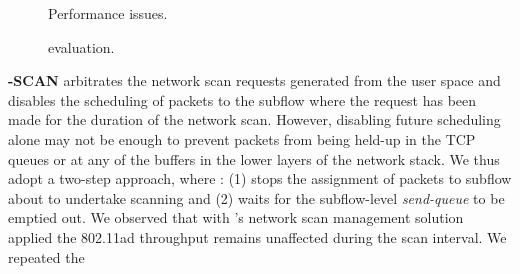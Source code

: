\begin{figure*}[t]
    \centering
    \hfill
    \hfill
    \vspace{-0.15in}
    \caption{Performance issues.}
    \vspace{-0.1in}
\end{figure*}
\fi
\begin{figure}[t]
    \centering
    \hfill
    \vspace{-0.2in}
    \caption{\name evaluation.}
    \vspace{-0.2in}
\end{figure}
\noindent\textbf{\name-SCAN} arbitrates the network scan requests generated
from the user space and disables the scheduling of packets to the
subflow where the request has been made for the duration of the
network scan. However, disabling future scheduling alone may not be
enough to prevent packets from being held-up in the TCP queues or at
any of the buffers in the lower layers of the network stack. We thus
adopt a two-step approach, where \name: (1) stops the assignment of
packets to subflow about to undertake scanning and (2) waits for the
subflow-level \emph{send-queue} to be emptied out. We observed that
with \name's network scan management solution applied 
the 802.11ad throughput remains unaffected during the scan interval. We repeated the
